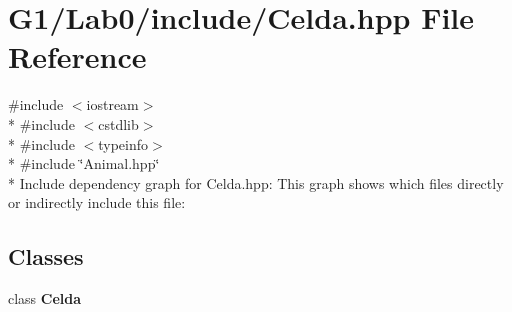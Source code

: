 \section{G1/\+Lab0/include/\+Celda.hpp File Reference}
\label{_celda_8hpp}
{\ttfamily \#include $<$iostream$>$}\\*
{\ttfamily \#include $<$cstdlib$>$}\\*
{\ttfamily \#include $<$typeinfo$>$}\\*
{\ttfamily \#include \char`\"{}Animal.\+hpp\char`\"{}}\\*
Include dependency graph for Celda.\+hpp\+:
This graph shows which files directly or indirectly include this file\+:
\subsection*{Classes}
\begin{DoxyCompactItemize}
\item 
class {\bf Celda}
\end{DoxyCompactItemize}
